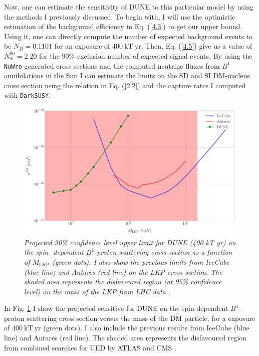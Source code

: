 Now, one can estimate the sensitivity of DUNE to this particular model by using the methods I previously discussed. To begin with, I will use the optimistic estimation of the background efficiency in Eq. (\ref{4.3}) to get our upper bound. Using it, one can directly compute the number of expected background events to be $N_{B} = 0.1101$ for an exposure of $400 \ \mathrm{kT}  \ \mathrm{yr}$. Then, Eq. (\ref{4.5}) give us a value of $N_{S}^{90} = 2.20$ for the $90\%$ exclusion number of expected signal events. By using the \texttt{NuWro} generated cross sections and the computed neutrino fluxes from $B^{1}$ annihilations in the Sun I can estimate the limits on the SD and SI DM-nucleus cross section using the relation in Eq. (\ref{2.2}) and the capture rates I computed with \texttt{DarkSUSY}.

\begin{figure}[t]
	\centering
	\includegraphics[width=0.9\linewidth]{Images/DM_Analysis/kk_xsection_sd_bounds}
	\caption{\textit{Projected 90\% confidence level upper limit for DUNE (400 kT yr) on the spin- dependent $B^{1}$-proton scattering cross section as a function of $M_{\mathrm{LKP}}$ (green dots). I also show the previous limits from IceCube \cite{Bernadich2019} (blue line) and Antares \cite{Zornoza2012} (red line) on the LKP cross section. The shaded area represents the disfavoured region (at 95\% confidence level) on the mass of the LKP from LHC data \cite{Deutschmann2017}.}}
	\label{fig:kk_xsection_sd_bounds}
\end{figure}

In Fig. \ref{fig:kk_xsection_sd_bounds} I show the projected sensitive for DUNE on the spin-dependent $B^{1}$-proton scattering cross section versus the mass of the DM particle, for a exposure of $400 \ \mathrm{kT}  \ \mathrm{yr}$ (green dots). I also include the previous results from IceCube \cite{Bernadich2019} (blue line) and Antares \cite{Zornoza2012} (red line). The shaded area represents the disfavoured region from combined searches for UED by ATLAS and CMS \cite{Deutschmann2017}.


